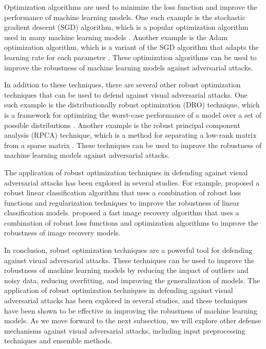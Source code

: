 \documentclass[11pt]{article}
\begin{document}
Optimization algorithms are used to minimize the loss function and improve the performance of machine learning models. One such example is the stochastic gradient descent (SGD) algorithm, which is a popular optimization algorithm used in many machine learning models \cite{ref130}. Another example is the Adam optimization algorithm, which is a variant of the SGD algorithm that adapts the learning rate for each parameter \cite{ref131}. These optimization algorithms can be used to improve the robustness of machine learning models against adversarial attacks.

In addition to these techniques, there are several other robust optimization techniques that can be used to defend against visual adversarial attacks. One such example is the distributionally robust optimization (DRO) technique, which is a framework for optimizing the worst-case performance of a model over a set of possible distributions \cite{ref132}. Another example is the robust principal component analysis (RPCA) technique, which is a method for separating a low-rank matrix from a sparse matrix \cite{ref133}. These techniques can be used to improve the robustness of machine learning models against adversarial attacks.

The application of robust optimization techniques in defending against visual adversarial attacks has been explored in several studies. For example, \cite{ref134} proposed a robust linear classification algorithm that uses a combination of robust loss functions and regularization techniques to improve the robustness of linear classification models. \cite{ref135} proposed a fast image recovery algorithm that uses a combination of robust loss functions and optimization algorithms to improve the robustness of image recovery models.

In conclusion, robust optimization techniques are a powerful tool for defending against visual adversarial attacks. These techniques can be used to improve the robustness of machine learning models by reducing the impact of outliers and noisy data, reducing overfitting, and improving the generalization of models. The application of robust optimization techniques in defending against visual adversarial attacks has been explored in several studies, and these techniques have been shown to be effective in improving the robustness of machine learning models. As we move forward to the next subsection, we will explore other defense mechanisms against visual adversarial attacks, including input preprocessing techniques and ensemble methods.
\end{document}
